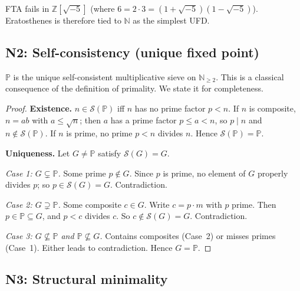 \documentclass[12pt,a4paper]{article}
\begin{document}
\begin{remark}
FTA fails in $\mathbb{Z}[\sqrt{-5}]$ (where $6 = 2 \cdot 3 = (1+\sqrt{-5})(1-\sqrt{-5})$).
Eratosthenes is therefore tied to $\mathbb{N}$ as the simplest UFD.
\end{remark}

\subsection{N2: Self-consistency (unique fixed point)}
\label{sec:N2}

\mTHM
\begin{theorem}
\label{thm:N2}
$\mathbb{P}$ is the unique self-consistent multiplicative sieve on
$\mathbb{N}_{\geq 2}$.
This is a classical consequence of the definition of primality.
We state it for completeness.

\begin{proof}
\textbf{Existence.} $n \in \mathcal{S}(\mathbb{P})$ iff $n$ has no prime
factor $p < n$. If $n$ is composite, $n = ab$ with $a \leq \sqrt{n}$;
then $a$ has a prime factor $p \leq a < n$, so $p \mid n$ and $n
\notin \mathcal{S}(\mathbb{P})$. If $n$ is prime, no prime $p < n$
divides $n$. Hence $\mathcal{S}(\mathbb{P}) = \mathbb{P}$.

\textbf{Uniqueness.} Let $G \neq \mathbb{P}$ satisfy $\mathcal{S}(G) = G$.

\textit{Case 1: $G \subsetneq \mathbb{P}$.} Some prime $p \notin G$.
Since $p$ is prime, no element of $G$ properly divides $p$; so $p \in
\mathcal{S}(G) = G$. Contradiction.

\textit{Case 2: $G \supsetneq \mathbb{P}$.} Some composite $c \in G$.
Write $c = p \cdot m$ with $p$ prime. Then $p \in \mathbb{P} \subseteq G$,
and $p < c$ divides $c$. So $c \notin \mathcal{S}(G) = G$. Contradiction.

\textit{Case 3: $G \not\subseteq \mathbb{P}$ and $\mathbb{P} \not\subseteq G$.}
Contains composites (Case~2) or misses primes (Case~1). Either leads to
contradiction. Hence $G = \mathbb{P}$.
\end{proof}
\end{theorem}

\subsection{N3: Structural minimality}
\label{sec:N3}
\end{document}
